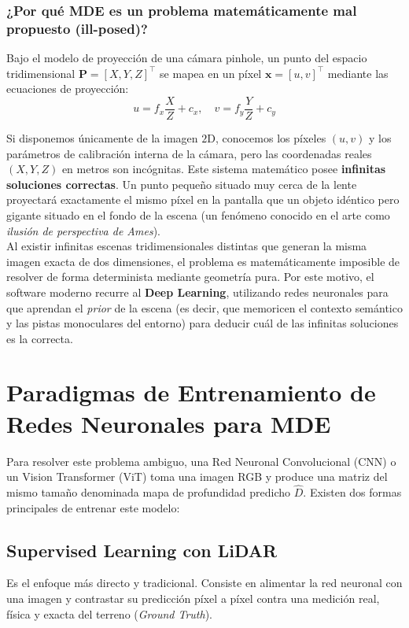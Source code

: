 \subsubsection{¿Por qué MDE es un problema matemáticamente mal propuesto (ill-posed)?}
\noindent
Bajo el modelo de proyección de una cámara pinhole, un punto del espacio tridimensional $\mathbf{P} = [X, Y, Z]^{\top}$ se mapea en un píxel $\mathbf{x} = [u, v]^{\top}$ mediante las ecuaciones de proyección:
\begin{equation}
    u = f_x \frac{X}{Z} + c_x, \quad v = f_y \frac{Y}{Z} + c_y
\end{equation}

\noindent
Si disponemos únicamente de la imagen $2\text{D}$, conocemos los píxeles $(u, v)$ y los parámetros de calibración interna de la cámara, pero las coordenadas reales $(X, Y, Z)$ en metros son incógnitas. Este sistema matemático posee \textbf{infinitas soluciones correctas}. Un punto pequeño situado muy cerca de la lente proyectará exactamente el mismo píxel en la pantalla que un objeto idéntico pero gigante situado en el fondo de la escena (un fenómeno conocido en el arte como \textit{ilusión de perspectiva de Ames}). \\

\noindent
Al existir infinitas escenas tridimensionales distintas que generan la misma imagen exacta de dos dimensiones, el problema es matemáticamente imposible de resolver de forma determinista mediante geometría pura. Por este motivo, el software moderno recurre al \textbf{Deep Learning}, utilizando redes neuronales para que aprendan el \textit{prior} de la escena (es decir, que memoricen el contexto semántico y las pistas monoculares del entorno) para deducir cuál de las infinitas soluciones es la correcta.

\section{Paradigmas de Entrenamiento de Redes Neuronales para MDE}

Para resolver este problema ambiguo, una Red Neuronal Convolucional (CNN) o un Vision Transformer (ViT) toma una imagen RGB y produce una matriz del mismo tamaño denominada mapa de profundidad predicho $\hat{D}$. Existen dos formas principales de entrenar este modelo:

\subsection{Supervised Learning con LiDAR }
\noindent
Es el enfoque más directo y tradicional. Consiste en alimentar la red neuronal con una imagen y contrastar su predicción píxel a píxel contra una medición real, física y exacta del terreno (\textit{Ground Truth}).

